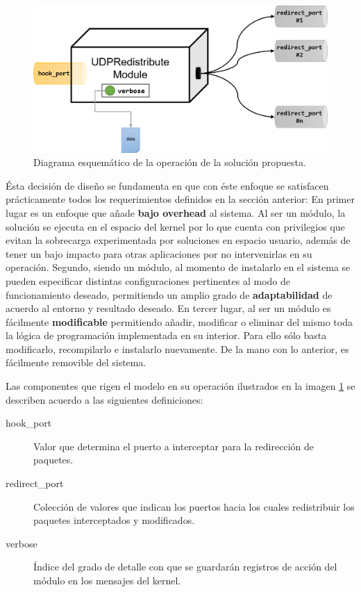 	\begin{figure}[!h]
		\centering
		\includegraphics[scale=.55]{imagenes/udpredistributemoduleDiagram.png}
		\caption{Diagrama esquemático de la operación de la solución propuesta.}
		\label{fig:modeloUDPRedistribuyeModule}
	\end{figure}

Ésta decisión de diseño se fundamenta en que con éste enfoque se satisfacen prácticamente todos los requerimientos definidos en la sección anterior: En primer lugar es un enfoque que añade \textbf{bajo overhead} al sistema. Al ser un módulo, la solución se ejecuta en el espacio del kernel por lo que cuenta con privilegios que evitan la sobrecarga experimentada por soluciones en espacio usuario, además de tener un bajo impacto para otras aplicaciones por no intervenirlas en su operación. Segundo, siendo un módulo, al momento de instalarlo en el sistema se pueden especificar distintas configuraciones pertinentes al modo de funcionamiento deseado, permitiendo un amplio grado de \textbf{adaptabilidad} de acuerdo al entorno y resultado deseado. En tercer lugar, al ser un módulo es fácilmente \textbf{modificable} permitiendo añadir, modificar o eliminar del mismo toda la lógica de programación implementada en su interior. Para ello sólo basta modificarlo, recompilarlo e instalarlo nuevamente. De la mano con lo anterior, es fácilmente removible del sistema.

Las componentes que rigen el modelo en su operación ilustrados en la imagen \ref{fig:modeloUDPRedistribuyeModule} se describen acuerdo a las siguientes definiciones:


\begin{description}
\item[hook\_port] Valor que determina el puerto a interceptar para la redirección de paquetes.
\item[redirect\_port] Colección de valores que indican los puertos hacia los cuales redistribuir los paquetes interceptados y modificados.
\item[verbose] Índice del grado de detalle con que se guardarán registros de acción del módulo en los mensajes del kernel.
\end{description}

